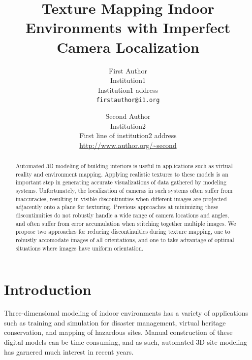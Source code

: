 \documentclass[10pt,twocolumn,letterpaper]{article}
\begin{document}
\title{Texture Mapping Indoor Environments with Imperfect Camera Localization}

\author{First Author\\
  Institution1\\
  Institution1 address\\
  {\tt\small firstauthor@i1.org}
  \and
  Second Author\\
  Institution2\\
  First line of institution2 address\\
  {\small\url{http://www.author.org/~second}} }

\maketitle

\begin{abstract}
  Automated 3D modeling of building interiors is useful in
  applications such as virtual reality and environment
  mapping. Applying realistic textures to these models is an important
  step in generating accurate visualizations of data gathered by
  modeling systems.  Unfortunately, the localization of cameras in
  such systems often suffer from inaccuracies, resulting in visible
  discontinuties when different images are projected adjacently onto a
  plane for texturing. Previous approaches at minimizing these
  discontinuities do not robustly handle a wide range of camera
  locations and angles, and often suffer from error accumulation when
  stitching together multiple images. We propose two approaches for
  reducing discontinuities during texture mapping, one to robustly
  accomodate images of all orientations, and one to take advantage of
  optimal situations where images have uniform orientation.
\end{abstract}

\section{Introduction}
Three-dimensional modeling of indoor environments has a variety of
applications such as training and simulation for disaster management,
virtual heritage conservation, and mapping of hazardous sites. Manual
construction of these digital models can be time consuming, and as
such, automated 3D site modeling has garnered much interest in recent
years.
\end{document}
